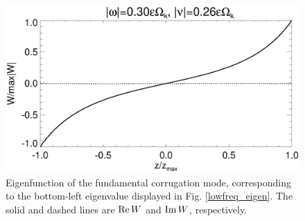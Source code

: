\begin{figure}
  \includegraphics[width=\linewidth]{figures/eigenvector_iso}
  \caption{Eigenfunction of the fundamental corrugation mode,
    corresponding to the 
    bottom-left eigenvalue displayed in Fig. \ref{lowfreq_eigen}. The
    solid and dashed lines are $\operatorname{Re} W$ and $\operatorname{Im} W$, respectively. 
    \label{lowfreq_eigenfunc}
  }
\end{figure}
